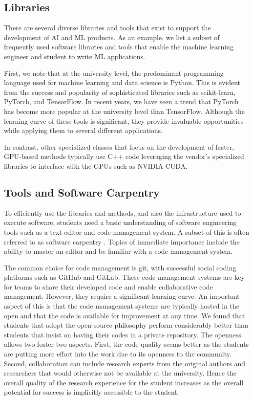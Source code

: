 \documentclass[utf8]{FrontiersinVancouver} %
\begin{document}
\subsection{Libraries}

There are several diverse libraries and tools that exist to support
the development of AI and ML products.  As an example, we list a
subset of frequently used software libraries and tools that enable the
machine learning engineer and student to write ML applications.

First, we note that at the university level, the predominant
programming language used for machine learning and data science is
Python. This is evident from the success and popularity of
sophisticated libraries such as scikit-learn, PyTorch, and
TensorFlow. In recent years, we have seen a trend that PyTorch has
become more popular at the university level than TensorFlow.  Although
the learning curve of these tools is significant, they provide
invaluable opportunities while applying them to several different
applications.

In contrast, other specialized classes that focus on the development
of faster, GPU-based methods typically use C++ code leveraging the
vendor's specialized libraries to interface with the GPUs such as
NVIDIA CUDA.

\subsection{Tools and Software Carpentry}\label{sec:tools}


To efficiently use the libraries and methods, and also the
infrastructure used to execute software, students need a basic
understanding of software engineering tools such as a text editor and
code management system.  A subset of this is often referred to as
software carpentry \cite{software-carpentry}. Topics of immediate
importance include the ability to master an editor and be familiar
with a code management system.

The common choice for code management is git, with successful social
coding platforms such as GitHub and GitLab.  These code management
systems are key for teams to share their developed code and enable
collaborative code management.  However, they require a significant
learning curve. An important aspect of this is that the code
management systems are typically hosted in the open and that the code
is available for improvement at any time. We found that students that
adopt the open-source philosophy perform considerably better than
students that insist on having their codes in a private
repository. The openness allows two foster two aspects. First, the
code quality seems better as the students are putting more effort into
the work due to its openness to the community. Second, collaboration
can include research experts from the original authors and researchers
that would otherwise not be available at the university. Hence the
overall quality of the research experience for the student increases
as the overall potential for success is implicitly accessible to the
student.
\end{document}
